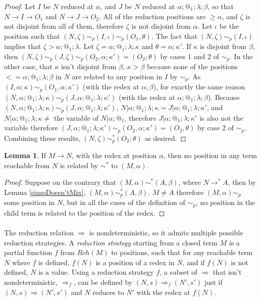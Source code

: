 \documentclass{article}
\theoremstyle{definition}
\theoremstyle{lemma}
\newtheorem{lemma}{Lemma}
\theoremstyle{remark}
\begin{document}
\begin{proof}
Let $I$ be $N$ reduced at $\alpha$, and $J$ be $N$ reduced at $\alpha;@_1;\lambda;\beta$, so that $N \to I \to O_1$ and $N \to J \to O_2$. All of the reduction positions are $\geq \alpha$, and $\zeta$ is not disjoint from all of them, therefore $\zeta$ is not disjoint from $\alpha$. Let $\iota$ be the position such that $(N,\zeta) \sim_p (I,\iota) \sim_p (O_1,\theta)$. The fact that $(N,\zeta) \sim_p (I,\iota)$ implies that $\zeta > \alpha;@_1;\lambda$. Let $\zeta = \alpha;@_1;\lambda;\kappa$ and $\theta = \alpha;\kappa'$. If $\kappa$ is disjoint from $\beta$, then $(N,\zeta) \sim_p (J,\zeta) \sim_p (O_2,\alpha;\kappa') = (O_2;\theta)$ by cases 1 and 2 of $\sim_p$. In the other case, that $\kappa$ isn't disjoint from $\beta$, $\kappa > \beta$ because none of the positions $<= \alpha;@_1;\lambda;\beta$ in $N$ are related to any position in $I$ by $\sim_p$. As $(I,\alpha;\kappa) \sim_p (O_1,\alpha;\kappa')$ (with the redex at $\alpha;\beta$), for exactly the same reason $(N,\alpha;@_1;\lambda;\kappa) \sim_p (J,\alpha;@_1;\lambda;\kappa')$ (with the redex at $\alpha;@_1;\lambda;\beta$). Because $(N,\alpha;@_1;\lambda;\kappa) \sim_p (J,\alpha;@_1;\lambda;\kappa')$, $N|\alpha;@_1;\lambda;\kappa = J|\alpha;@_1;\lambda;\kappa'$, and $N|\alpha;@_1;\lambda;\kappa \neq $ the variable of $N|\alpha;@_1$, therefore $J|\alpha;@_1;\lambda;\kappa'$ is also not the variable therefore $(J,\alpha;@_1;\lambda;\kappa') \sim_p (O_2, \alpha;\kappa') = (O_2, \theta)$ by case 2 of $\sim_p$. Combining these results, $(N,\zeta) \sim_p^* (O_2;\theta)$ as desired.
\end{proof}

\begin{lemma} \label{lem:redexDestroyed}
If $M \to N$, with the redex at position $\alpha$, then no position in any term reachable from $N$ is related by $\sim^*$ to $(M,\alpha)$.
\end{lemma}
\begin{proof}
Suppose on the contrary that $(M,\alpha) \sim^* (A,\beta)$, where $N \to^* A$, then by Lemma \ref{simpDoesn'tMix}, $(M,\alpha) \sim_p^* (A,\beta)$. $M \neq A$ therefore $(M,\alpha) \sim_p$ some position in $N$, but in all the cases of the definition of $\sim_p$, no position in the child term is related to the position of the redex.
\end{proof}

\paragraph{}
The reduction relation $\Rightarrow$ is nondeterministic, so it admits multiple possible reduction strategies. 
A \emph{reduction strategy} starting from a closed term $M$ is a partial function $f$ from $Rch(M)$ to positions, such that for any reachable term $N$ where $f$ is defined, $f(N)$ is a position of a redex in $N$, and if $f(N)$ is not defined, $N$ is a value.
Using a reduction strategy $f$, a subset of $\Rightarrow$ that isn't nondeterministic, $\Rightarrow_f$, can be defined by $(N,s) \Rightarrow_f (N',s')$ just if $(N,s) \Rightarrow (N',s')$ and $N$ reduces to $N'$ with the redex at $f(N)$.
\end{document}
